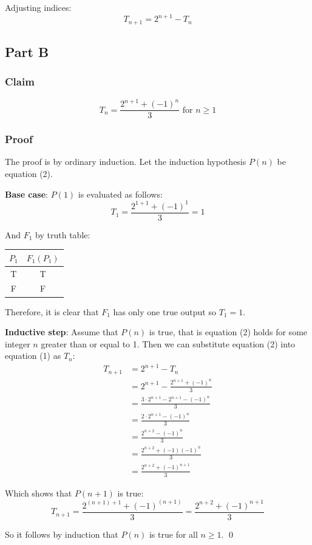\documentclass{article}
\begin{document}
Adjusting indices:
\begin{equation}
  T_{n + 1} = 2^{n + 1} - T_{n}
\end{equation}

\bigbreak
\bigbreak
\bigbreak
\bigbreak
\bigbreak
\bigbreak

\subsection*{Part B}

\subsubsection*{Claim}

\begin{equation}
  T_{n} = \frac{ 2^{n + 1} + (-1)^{n} }{ 3 } \textrm{ for } n \geq 1
\end{equation}

\subsubsection*{Proof}

The proof is by ordinary induction. Let the induction hypothesis $P(n)$ be
equation (2).

\bigbreak

\textbf{Base case}: $P(1)$ is evaluated as follows:
$$ T_{1} = \frac{ 2^{1 + 1} + (-1)^{1} }{ 3 } = 1 $$

And $F_{1}$ by truth table:
\begin{center}
  \begin{tabular}{ c | c }
    $P_{1}$ & $F_{1}(P_{1})$ \\\hline
    T & T \\
    F & F
  \end{tabular}
\end{center}

Therefore, it is clear that $F_{1}$ has only one true output so $T_{1} = 1$.

\bigbreak

\textbf{Inductive step}: Assume that $P(n)$ is true, that is equation (2) holds
for some integer $n$ greater than or equal to 1. Then we can substitute equation
(2) into equation (1) as $T_{n}$:
\begin{align*}
  T_{n + 1} &= 2^{n + 1} - T_{n} \\
            &= 2^{n + 1} - \frac{ 2^{n + 1} + (-1)^{n} }{ 3 } \\
            &= \frac{ 3 \cdot 2^{n + 1} - 2^{n + 1} - (-1)^{n} }{ 3 } \\
            &= \frac{ 2 \cdot 2^{n + 1} - (-1)^{n} }{ 3 } \\
            &= \frac{ 2^{n + 2} - (-1)^{n} }{ 3 } \\
            &= \frac{ 2^{n + 2} + (-1)(-1)^{n} }{ 3 } \\
            &= \frac{ 2^{n + 2} + (-1)^{n + 1} }{ 3 }
\end{align*}

Which shows that $P(n + 1)$ is true:
$$ T_{n + 1} = \frac{ 2^{(n + 1) + 1} + (-1)^{(n + 1)}}{ 3 } = \frac{ 2^{n + 2}
+ (-1)^{n + 1}}{ 3 }$$

So it follows by induction that $P(n)$ is true for all $n \geq 1$. \qed
\end{document}
